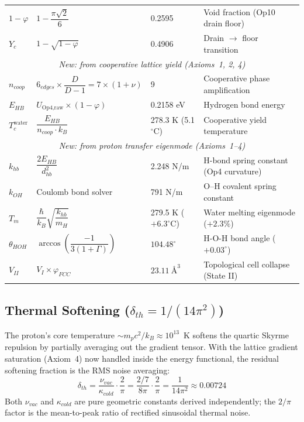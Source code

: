 {\begin{longtable}{@{} l p{4.5cm} l p{4.5cm} @{}}
$1 - \varphi$ & $1 - \dfrac{\pi\sqrt{2}}{6}$
    & 0.2595
    & Void fraction (Op10 drain floor) \\[6pt]
$Y_c$ & $1 - \sqrt{1 - \varphi}$
    & 0.4906
    & Drain $\to$ floor transition \\[6pt]
\midrule
\multicolumn{4}{c}{\textit{New: from cooperative lattice yield (Axioms~1, 2, 4)}} \\[4pt]
$n_{coop}$ & $6_{edges} \times \dfrac{D}{D-1} = 7 \times (1+\nu)$
    & 9
    & Cooperative phase amplification \\[6pt]
$E_{HB}$ & $U_{\text{Op4,raw}} \times (1 - \varphi)$
    & 0.2158 eV
    & Hydrogen bond energy \\[6pt]
$T_c^{\text{water}}$ & $\dfrac{E_{HB}}{n_{coop} \cdot k_B}$
    & 278.3 K (5.1$^\circ$C)
    & Cooperative yield temperature \\[6pt]
\midrule
\multicolumn{4}{c}{\textit{New: from proton transfer eigenmode (Axioms~1--4)}} \\[4pt]
$k_{hb}$ & $\dfrac{2 E_{HB}}{d_{hb}^2}$
    & 2.248 N/m
    & H-bond spring constant (Op4 curvature) \\[6pt]
$k_{OH}$ & Coulomb bond solver
    & 791 N/m
    & O--H covalent spring constant \\[6pt]
$T_m$ & $\dfrac{\hbar}{k_B}\sqrt{\dfrac{k_{hb}}{m_H}}$
    & 279.5 K ($+6.3^\circ$C)
    & Water melting eigenmode ($+2.3\%$) \\[6pt]
$\theta_{HOH}$ & $\arccos\!\left(\dfrac{-1}{3(1+\Gamma)}\right)$
    & $104.48^\circ$
    & H-O-H bond angle ($+0.03^\circ$) \\[6pt]
$V_{II}$ & $V_I \times \varphi_{FCC}$
    & $23.11\ \text{\AA}^3$
    & Topological cell collapse (State II) \\[6pt]
\end{longtable}
}

\subsection{Thermal Softening ($\delta_{th} = 1/(14\pi^2)$)}

The proton's core temperature $\sim m_p c^2 / k_B \approx 10^{13}$~K
softens the quartic Skyrme repulsion by partially averaging out the
gradient tensor.  With the lattice gradient saturation (Axiom~4) now
handled inside the energy functional, the residual softening fraction
is the RMS noise averaging:
\begin{equation}
    \delta_{th} = \frac{\nu_{vac}}{\kappa_{cold}} \cdot \frac{2}{\pi}
    = \frac{2/7}{8\pi} \cdot \frac{2}{\pi} = \frac{1}{14\pi^2} \approx 0.00724
\end{equation}
Both $\nu_{vac}$ and $\kappa_{cold}$ are pure geometric constants
derived independently; the $2/\pi$ factor is the mean-to-peak ratio
of rectified sinusoidal thermal noise.

